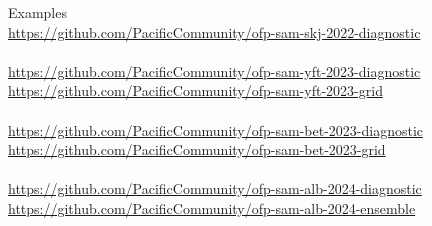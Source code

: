 \documentclass[aspectratio=169,fleqn]{beamer}
\begin{document}

\begin{frame}{Examples}\small\blue
  \\[0.5ex]
  \quad\url{https://github.com/PacificCommunity/ofp-sam-skj-2022-diagnostic}\\[3ex]
  \\[0.5ex]
  \quad\url{https://github.com/PacificCommunity/ofp-sam-yft-2023-diagnostic}\\
  \quad\url{https://github.com/PacificCommunity/ofp-sam-yft-2023-grid}\\[3ex]
  \\[0.5ex]
  \quad\url{https://github.com/PacificCommunity/ofp-sam-bet-2023-diagnostic}\\
  \quad\url{https://github.com/PacificCommunity/ofp-sam-bet-2023-grid}\\[3ex]
  \\[0.5ex]
  \quad\url{https://github.com/PacificCommunity/ofp-sam-alb-2024-diagnostic}\\
  \quad\url{https://github.com/PacificCommunity/ofp-sam-alb-2024-ensemble}\\
\end{frame}
\end{document}

